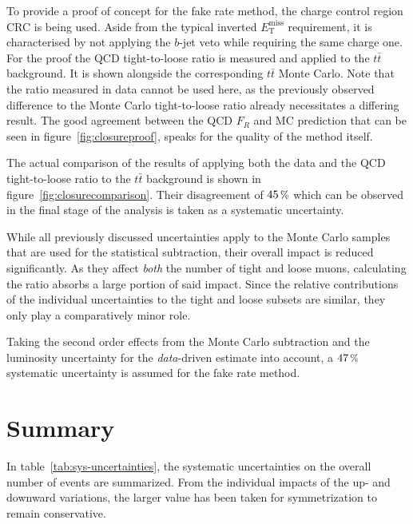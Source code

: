 To provide a proof of concept for the fake rate method, the charge control region CRC is being used. Aside from the typical inverted $E_{\text{T}}^{\text{miss}}$ requirement, it is characterised by not applying the $b$-jet veto while requiring the same charge one. For the proof the QCD tight-to-loose ratio is measured and applied to the $t\bar{t}$ background. It is shown alongside the corresponding $t\bar{t}$ Monte Carlo. Note that the ratio measured in data cannot be used here, as the previously observed difference to the Monte Carlo tight-to-loose ratio already necessitates a differing result. The good agreement between the QCD $F_R$ and MC prediction that can be seen in figure~\ref{fig:closureproof}, speaks for the quality of the method itself.

The actual comparison of the results of applying both the data and the QCD tight-to-loose ratio to the $t\bar{t}$ background is shown in figure~\ref{fig:closurecomparison}. Their disagreement of $45\,\pct$ which can be observed in the final stage of the analysis is taken as a systematic uncertainty.

While all previously discussed uncertainties apply to the Monte Carlo samples that are used for the statistical subtraction, their overall impact is reduced significantly. As they affect \textit{both} the number of tight and loose muons, calculating the ratio absorbs a large portion of said impact. Since the relative contributions of the individual uncertainties to the tight and loose subsets are similar, they only play a comparatively minor role.

Taking the second order effects from the Monte Carlo subtraction and the luminosity uncertainty for the \textit{data}-driven estimate into account, a $47\,\pct$ systematic uncertainty is assumed for the fake rate method.


\section{Summary}
\label{sec:summary}

In table~\ref{tab:sys-uncertainties}, the systematic uncertainties on the overall number of events are summarized. From the individual impacts of the up- and downward variations, the larger value has been taken for symmetrization to remain conservative.

